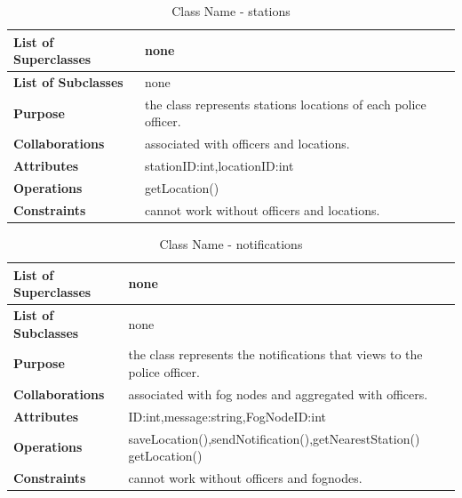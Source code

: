 \documentclass[12pt]{article}
\begin{document}
\begin{table}[h!]
\caption{Class Name - stations}
\label{tab:my-table}
\begin{tabular}{|p{}|p{}|}


 \hline
\textbf{List of Superclasses}  & none                                                     
\\ \hline
\textbf{List of Subclasses}    & none                                                                    
\\ \hline
\textbf{Purpose}               & the class represents stations locations of each police officer.                                                                        
\\ \hline
\textbf{Collaborations}        & associated with officers and locations.
\\ \hline
\textbf{Attributes}  & stationID:int,locationID:int
\\ \hline
\textbf{Operations} & 
getLocation()
\\ \hline
\textbf{Constraints} & cannot work without officers and locations.
\\ \hline
\end{tabular}
\end{table}


\begin{table}[h!]
\caption{Class Name - notifications}
\label{tab:my-table}
\begin{tabular}{|p{}|p{}|}


 \hline
\textbf{List of Superclasses}  & none                                                     
\\ \hline
\textbf{List of Subclasses}    & none                                                                    
\\ \hline
\textbf{Purpose}               & the class represents the notifications that views to the police officer.                                                                        
\\ \hline
\textbf{Collaborations}        & associated with fog nodes and aggregated with officers.
\\ \hline
\textbf{Attributes}  & ID:int,message:string,FogNodeID:int
\\ \hline
\textbf{Operations} & saveLocation(),sendNotification(),getNearestStation()
getLocation()
\\ \hline
\textbf{Constraints} & cannot work without officers and fognodes.
\\ \hline
\end{tabular}
\end{table}
\end{document}
